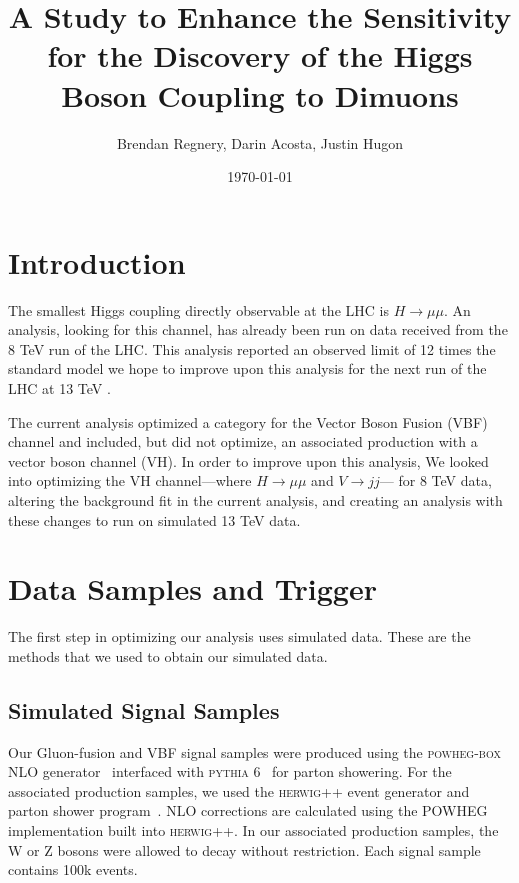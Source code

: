 \documentclass[12pt]{article}
\title{A Study to Enhance the Sensitivity for the Discovery of the Higgs Boson Coupling to Dimuons}
\author{Brendan Regnery, Darin Acosta, Justin Hugon}
\date{\today}
\begin{document}
\maketitle
 
\section{Introduction}

The smallest Higgs coupling directly observable at the LHC is $H\rightarrow \mu \mu$. 
An analysis, looking for this channel, has already been run on data received from the 8 TeV run of the LHC. 
This analysis reported an observed limit of 12 times the standard model \cite{hmumuPap} 
we hope to improve upon this analysis for the next run of the LHC at 13 TeV \cite{AN2012_459}. 

The current analysis optimized a category for the Vector Boson Fusion (VBF) channel and included, 
but did not optimize, an associated production with a vector boson channel (VH). 
In order to improve upon this analysis, We looked into optimizing the VH channel---where $H\rightarrow \mu \mu$ and $V\rightarrow jj$--- for 8 TeV data, 
altering the background fit in the current analysis, and creating an analysis with these changes to run on simulated 13 TeV data.

\section{Data Samples and Trigger}

The first step in optimizing our analysis uses simulated data. These are the methods that we used to obtain our simulated data.

\subsection{Simulated Signal Samples}

Our Gluon-fusion and VBF signal samples were produced using the \textsc{powheg-box} NLO generator~\cite{powheg1,powheg2,powheg3} 
interfaced with \textsc{pythia} 6~\cite{pythia} for parton showering.
For the associated production samples, we used the \textsc{herwig}++ event generator and 
parton shower program~\cite{herwigpp}.  NLO corrections are calculated using the 
POWHEG implementation built into \textsc{herwig}++. 
In our associated production samples, the W or Z bosons were allowed to decay without restriction.
Each signal sample contains 100k events.
\end{document}
